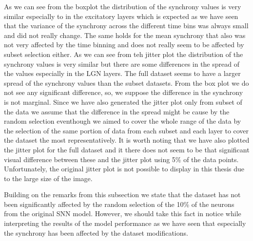 As we can see from the boxplot the distribution of the synchrony values is very similar especially to in the excitatory layers which is expected as we have seen that the variance of the synchrony across the different time bins was always small and did not really change. The same holds for the mean synchrony that also was not very affected by the time binning and does not really seem to be affected by subset selection either. As we can see from teh jitter plot the distribution of the synchrony values is very similar but there are some differences in the spread of the values especially in the LGN layers. The full dataset seems to have a larger spread of the synchrony values than the subset datasets. From the box plot we do not see any significant difference, so, we suppose the difference in the synchrony is not marginal. Since we have also generated the jitter plot only from subset of the data we assume that the difference in the spread might be cause by the random selection eventhough we aimed to cover the whole range of the data by the selection of the same portion of data from each subset and each layer to cover the dataset the most representatively. It is worth noting that we have also plotted the jitter plot for the full dataset and it there does not seem to be that significant visual difference between these and the jitter plot using 5\% of the data points. Unfortunately, the original jitter plot is not possible to display in this thesis due to the large size of the image.

Building on the remarks from this subsection we state that the dataset has not been significantly affected by the random selection of the 10\% of the neurons from the original SNN model. However, we should take this fact in notice while interpreting the results of the model performance as we have seen that especially the synchrony has been affected by the dataset modifications.